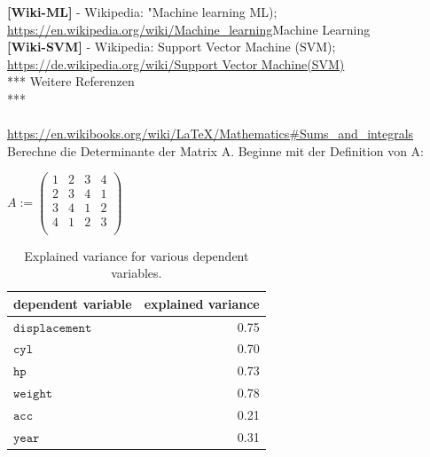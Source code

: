 \documentclass[12pt]{article}
\begin{document}
\textbf{[Wiki-ML]} - Wikipedia: "Machine learning ML); \url{https://en.wikipedia.org/wiki/Machine_learning}{Machine Learning}\\

\textbf{[Wiki-SVM]} - Wikipedia: Support Vector Machine (SVM); \url{https://de.wikipedia.org/wiki/Support Vector Machine(SVM)} \\

*** Weitere Referenzen \\
***\\
%
%
{\color{red}{*** Anlagen: Beispiele von Latex Syntax für eine Tabelle und eine Matrix  **}}\\[0.2cm]
%
\url{https://en.wikibooks.org/wiki/LaTeX/Mathematics#Sums_and_integrals}
%
Berechne die Determinante der Matrix A. Beginne mit der Definition von A:
\\[0.1cm]
\begin{center}
\hspace*{0.1cm}

$ A := \left(
   \begin{array}{llll}
     1 & 2 & 3 & 4 \\
     2 & 3 & 4 & 1 \\ 
     3 & 4 & 1 & 2 \\ 
     4 & 1 & 2 & 3 \\ 
   \end{array}
   \right) $ 
\\[0.3cm]

\end{center} 
\begin{table}[h]
  \centering
  \begin{tabular}{|l|r|}
  \hline
  dependent variable      & explained variance   \\
  \hline
  \hline
  $\mathtt{displacement}$ & 0.75                 \\
  \hline
  $\mathtt{cyl}$          & 0.70                 \\
  \hline
  $\mathtt{hp}$           & 0.73                 \\
  \hline
  $\mathtt{weight}$       & 0.78                 \\
  \hline
  $\mathtt{acc}$          & 0.21                 \\
  \hline
  $\mathtt{year}$         & 0.31                 \\
  \hline
  \end{tabular}
  \caption[explained variance]{Explained variance for various dependent variables.}
  \label{tab:explained-variance}
\end{table}
\end{document}
